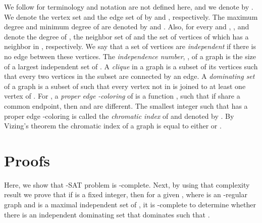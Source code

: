 \documentclass[
final
]{dmtcs-episciences}
\begin{document}
We follow \cite{MR1567289, MR1367739} for terminology and
notation are not defined here, and we denote  by .
We denote the vertex set and the edge set of
 by  and , respectively. The maximum degree
and minimum degree of  are denoted by  and .
Also, for every  and , ,  and   denote the degree of ,  the neighbor set of 
and the set of vertices of  which has a neighbor in , respectively.
We say that a set of vertices are {\it independent} if there is no edge
between these vertices.
The {\it independence number}, , of a graph  is the size of a largest independent set of
.
A {\it clique} in a  graph   is a subset of its vertices such that every two vertices in the subset are connected by an edge.
A {\it dominating set} of a graph  is a subset  of  such that every vertex
not in  is joined to at least one vertex  of .
For , a {\it proper edge -coloring} of  is a function , such that if  share a common endpoint,
then  and  are different.
The smallest integer  such that
 has a proper edge -coloring is called the {\it chromatic index} of  and denoted by . By Vizing's theorem   the chromatic index of a graph  is equal to either  or  \cite{MR0180505}.


\section{Proofs}

Here, we show that   -SAT problem is -complete. Next, by using  that complexity result we prove that if 
 is a fixed integer, then for a given , where  is an -regular graph and  is  a  maximal independent set of , it  is -complete to determine whether
there is an independent dominating set  that dominates  such that .
\end{document}
